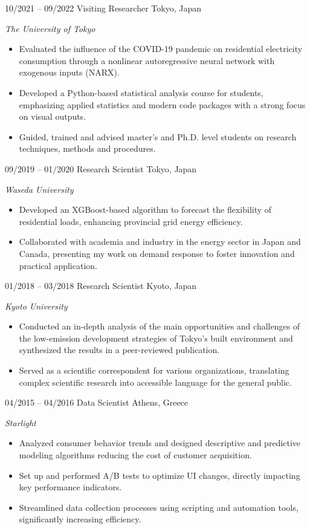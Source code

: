 \begin{entrylist}
\entry
{10/2021 -- 09/2022}
{Visiting Researcher}
{Tokyo, Japan}
{\emph{The University of Tokyo}
\begin{itemize}
	\item Evaluated the influence of the COVID-19 pandemic on residential electricity consumption through a nonlinear autoregressive neural network with exogenous inputs (NARX). %
 	\item Developed a Python-based statistical analysis course for students, emphasizing applied statistics and modern code packages with a strong focus on visual outputs. %
	\item Guided, trained and advised master's and Ph.D. level students on research techniques, methods and procedures. %
\end{itemize}
}

\entry
{09/2019 -- 01/2020}
{Research Scientist}
{Tokyo, Japan}
{\emph{Waseda University}
\begin{itemize}
\item Developed an XGBoost-based algorithm to forecast the flexibility of residential loads, enhancing provincial grid energy efficiency. %
\item Collaborated with academia and industry in the energy sector in Japan and Canada, presenting my work on demand response to foster innovation and practical application. %
\end{itemize}
}
\end{entrylist}
\begin{entrylist}
\entry
{01/2018 -- 03/2018}
{Research Scientist}
{Kyoto, Japan}
{\emph{Kyoto University}
\begin{itemize}
\item Conducted an in-depth analysis of the main opportunities and challenges of the low-emission development strategies of Tokyo’s built environment and synthesized the results in a peer-reviewed publication. %
\item Served as a scientific correspondent for various organizations, translating complex scientific research into accessible language for the general public. %
\end{itemize}
}
\end{entrylist}
\begin{entrylist}
\entry
{04/2015 -- 04/2016}
{Data Scientist}
{Athens, Greece}
{\emph{Starlight}
\begin{itemize}
\item	Analyzed consumer behavior trends and designed descriptive and predictive modeling algorithms reducing the cost of customer acquisition. %
\item	Set up and performed A/B tests to optimize UI changes, directly impacting key performance indicators. %
\item	Streamlined data collection processes using scripting and automation tools, significantly increasing efficiency. %
\end{itemize}}
\end{entrylist}
